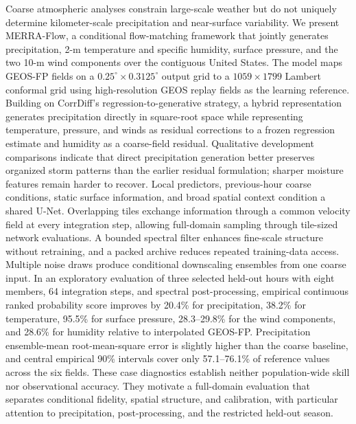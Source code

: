 \documentclass[10pt]{article}
\newcommand{\model}{MERRA-Flow}
\begin{document}
Coarse atmospheric analyses constrain large-scale weather but do not uniquely determine kilometer-scale precipitation and near-surface variability. We present \model{}, a conditional flow-matching framework that jointly generates precipitation, 2-m temperature and specific humidity, surface pressure, and the two 10-m wind components over the contiguous United States. The model maps GEOS-FP fields on a $0.25^\circ\times0.3125^\circ$ output grid to a $1059\times1799$ Lambert conformal grid using high-resolution GEOS replay fields as the learning reference. Building on CorrDiff's regression-to-generative strategy, a hybrid representation generates precipitation directly in square-root space while representing temperature, pressure, and winds as residual corrections to a frozen regression estimate and humidity as a coarse-field residual. Qualitative development comparisons indicate that direct precipitation generation better preserves organized storm patterns than the earlier residual formulation; sharper moisture features remain harder to recover. Local predictors, previous-hour coarse conditions, static surface information, and broad spatial context condition a shared U-Net. Overlapping tiles exchange information through a common velocity field at every integration step, allowing full-domain sampling through tile-sized network evaluations. A bounded spectral filter enhances fine-scale structure without retraining, and a packed archive reduces repeated training-data access. Multiple noise draws produce conditional downscaling ensembles from one coarse input. In an exploratory evaluation of three selected held-out hours with eight members, 64 integration steps, and spectral post-processing, empirical continuous ranked probability score improves by 20.4\% for precipitation, 38.2\% for temperature, 95.5\% for surface pressure, 28.3--29.8\% for the wind components, and 28.6\% for humidity relative to interpolated GEOS-FP. Precipitation ensemble-mean root-mean-square error is slightly higher than the coarse baseline, and central empirical 90\% intervals cover only 57.1--76.1\% of reference values across the six fields. These case diagnostics establish neither population-wide skill nor observational accuracy. They motivate a full-domain evaluation that separates conditional fidelity, spatial structure, and calibration, with particular attention to precipitation, post-processing, and the restricted held-out season.
\end{document}
